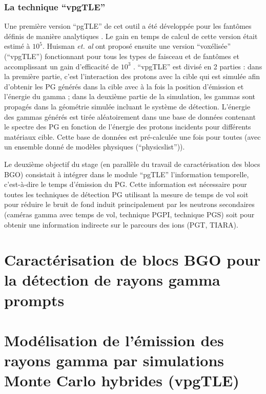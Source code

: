 \documentclass[11pt,a4paper,oldfontcommands]{memoir}
\begin{document}
\subsection{La technique \enquote{vpgTLE}}

Une première version \enquote{pgTLE} de cet outil a été développée pour les fantômes définis de manière analytiques \cite{El_Kanawati_2015}. Le gain en temps de calcul de cette version était estimé à $10^5$. Huisman \textit{et. al} ont proposé ensuite une version \enquote{voxélisée} (\enquote{vpgTLE}) fonctionnant pour tous les types de faisceau et de fantômes et accomplissant un gain d'efficacité de $10^3$ \cite{Huisman_2016}. \enquote{vpgTLE} est divisé en 2 parties : dans la première partie, c'est l'interaction des protons avec la cible qui est simulée afin d'obtenir les PG générés dans la cible avec à la fois la position d'émission et l'énergie du gamma  ; dans la deuxième partie de la simulation, les gammas sont propagés dans la géométrie simulée incluant le système de détection. L'énergie des gammas générés est tirée aléatoirement dans une base de données contenant le spectre des PG en fonction de l'énergie des protons incidents pour différents matériaux cible. Cette base de données est pré-calculée une fois pour toutes (avec un ensemble donné de modèles physiques (\enquote{physicslist})).

Le deuxième objectif du stage (en parallèle du travail de caractérisation des blocs BGO) consistait à intégrer dans le module \enquote{pgTLE} l'information temporelle, c'est-à-dire le temps d'émission du PG. Cette information est nécessaire pour toutes les techniques de détection PG utilisant la mesure de temps de vol soit pour réduire le bruit de fond induit principalement par les neutrons secondaires (caméras gamma avec temps de vol, technique PGPI, technique PGS) soit pour obtenir une information indirecte sur le parcours des ions (PGT, TIARA).


\openany
\chapter{Caractérisation de blocs BGO pour la détection de rayons gamma prompts}



\chapter{Modélisation de l'émission des rayons gamma par simulations Monte Carlo hybrides (vpgTLE)}
\end{document}

